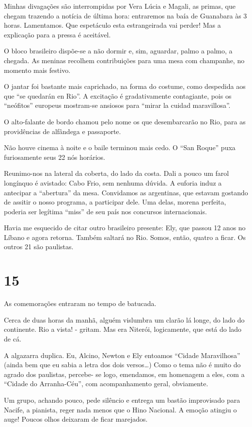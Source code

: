 Minhas divagações são interrompidas por Vera Lúcia e Magali, as primas, que chegam trazendo a notícia de última hora: entraremos na baía de Guanabara às 3 horas. Lamentamos. Que espetáculo esta estrangeirada vai perder! Mas a explicação para a pressa é aceitável.

O bloco brasileiro dispõe-se a não dormir e, sim, aguardar, palmo a palmo, a chegada. As meninas recolhem contribuições para uma mesa com champanhe, no momento mais festivo.

O jantar foi bastante mais caprichado, na forma do costume, como despedida aos que “se quedarán en Rio”. A excitação é gradativamente contagiante, pois os “neófitos” europeus mostram-se ansiosos para “mirar la cuidad maravillosa”.

O alto-falante de bordo chamou pelo nome os que desembarcarão no Rio, para as providências de alfândega e passaporte.

Não houve cinema à noite e o baile terminou mais cedo. O “San Roque” puxa furiosamente seus 22 nós horários.

Reunimo-nos na lateral da coberta, do lado da costa. Dali a pouco um farol longínquo é avistado: Cabo Frio, sem nenhuma dúvida. A euforia induz a antecipar a “abertura” da mesa. Convidamos as argentinas, que estavam gostando de assitir o nosso programa, a participar dele. Uma delas, morena perfeita, poderia ser legítima “miss” de seu país nos concursos internacionais.

Havia me esquecido de citar outro brasileiro presente: Ely, que passou 12 anos no Líbano e agora retorna. Também saltará no Rio. Somos, então, quatro a ficar. Os outros 21 são paulistas.

\section*{15 \adfflatleafright {}}
As comemorações entraram no tempo de batucada.

Cerca de duas horas da manhã, alguém vislumbra um clarão lá longe, do lado do continente. Rio a vista! - gritam. Mas era Niterói, logicamente, que está do lado de cá.

A algazarra duplica. Eu, Alcino, Newton e Ely entoamos “Cidade Maravilhosa” (ainda bem que eu sabia a letra dos dois versos\ldots) Como o tema não é muito do agrado dos paulistas, percebe- se logo, emendamos, em homenagem a eles, com a “Cidade do Arranha-Céu”, com acompanhamento geral, obviamente.

Um grupo, achando pouco, pede silêncio e entrega um bastão improvisado para Nacife, a pianista, reger nada menos que o Hino Nacional. A emoção atingiu o auge! Poucos olhos deixaram de ficar marejados.

